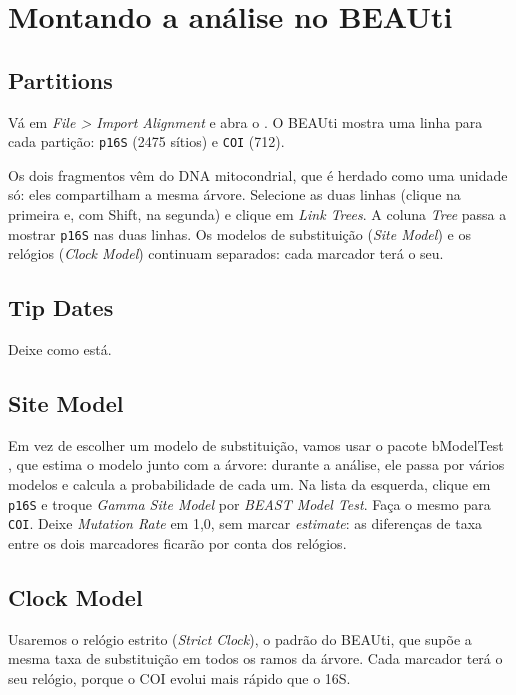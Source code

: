 \documentclass[11pt,a4paper]{article}
\newcommand{\arq}[1]{\path{#1}}
\newcommand{\ui}[1]{\textit{#1}}
\newcommand{\tecla}[1]{\textsf{#1}}
\begin{document}
\section{Montando a análise no BEAUti}

\subsection{Partitions}

Vá em \ui{File > Import Alignment} e abra o \arq{hylodidae_particionado.nex}. O BEAUti mostra
uma linha para cada partição: \verb|p16S| (2475 sítios) e \verb|COI| (712).

Os dois fragmentos vêm do DNA mitocondrial, que é herdado como uma unidade só: eles
compartilham a mesma árvore. Selecione as duas linhas (clique na primeira e, com
\tecla{Shift}, na segunda) e clique em \ui{Link Trees}. A coluna \ui{Tree} passa a mostrar
\verb|p16S| nas duas linhas. Os modelos de substituição (\ui{Site Model}) e os relógios
(\ui{Clock Model}) continuam separados: cada marcador terá o seu.

\subsection{Tip Dates}

Deixe como está.

\subsection{Site Model}

Em vez de escolher um modelo de substituição, vamos usar o pacote bModelTest
\cite{bouckaert2017}, que estima o modelo junto com a árvore: durante a análise, ele passa por
vários modelos e calcula a probabilidade de cada um. Na lista da esquerda, clique em \verb|p16S|
e troque \ui{Gamma Site Model} por \ui{BEAST Model Test}. Faça o mesmo para \verb|COI|. Deixe
\ui{Mutation Rate} em 1,0, sem marcar \ui{estimate}: as diferenças de taxa entre os dois
marcadores ficarão por conta dos relógios.

\subsection{Clock Model}\label{sec:clock}

Usaremos o relógio estrito (\ui{Strict Clock}), o padrão do BEAUti, que supõe a mesma taxa de
substituição em todos os ramos da árvore. Cada marcador terá o seu relógio, porque o COI
evolui mais rápido que o 16S.
\end{document}
